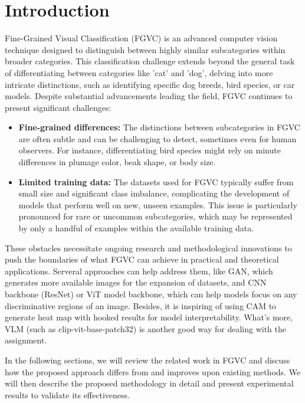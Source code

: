 \section{Introduction}
\label{sec:intro}

Fine-Grained Visual Classification (FGVC) is an advanced computer vision technique designed to distinguish between highly similar subcategories within broader categories. This classification challenge extends beyond the general task of differentiating between categories like 'cat' and 'dog', delving into more intricate distinctions, such as identifying specific dog breeds, bird species, or car models. Despite substantial advancements leading the field, FGVC continues to present significant challenges:

\begin{itemize}
    \item \textbf{Fine-grained differences:} The distinctions between subcategories in FGVC are often subtle and can be challenging to detect, sometimes even for human observers. For instance, differentiating bird species might rely on minute differences in plumage color, beak shape, or body size.
    \item \textbf{Limited training data:} The datasets used for FGVC typically suffer from small size and significant class imbalance, complicating the development of models that perform well on new, unseen examples. This issue is particularly pronounced for rare or uncommon subcategories, which may be represented by only a handful of examples within the available training data.
\end{itemize}

These obstacles necessitate ongoing research and methodological innovations to push the boundaries of what FGVC can achieve in practical and theoretical applications. Serveral approaches can help address them, like GAN, which generates more available images for the expansion of datasets, and CNN backbone 
(ResNet) or ViT model backbone, which can help models focus on any discriminative regions of an image. Besides, it is inspiring of using CAM to generate heat map with hooked results for model interpretability. What's more, VLM (such as clip-vit-base-patch32) is another good way for dealing with the assignment.

In the following sections, we will review the related work in FGVC and discuss how the proposed approach differs from and improves upon existing methods. We will then describe the proposed methodology in detail and present experimental results to validate its effectiveness.
